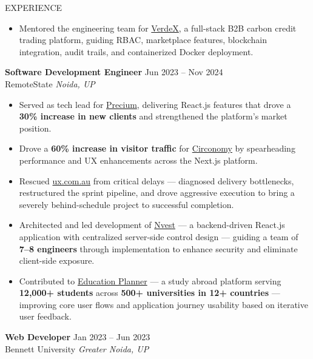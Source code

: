 \documentclass{resume} %
\begin{document}
\begin{rSection}{EXPERIENCE}
\begin{itemize}
    \item Mentored the engineering team for \href{https://verdex.co.in/}{VerdeX}, a full-stack B2B carbon credit trading platform, guiding RBAC, marketplace features, blockchain integration, audit trails, and containerized Docker deployment.

\end{itemize}

\textbf{Software Development Engineer} \hfill Jun 2023 -- Nov 2024\\
RemoteState \hfill \textit{Noida, UP}
\begin{itemize}
    \itemsep -5pt {}

    \item Served as tech lead for \href{https://precium.in}{Precium}, delivering React.js features that drove a \textbf{30\% increase in new clients} and strengthened the platform's market position.

    \item Drove a \textbf{60\% increase in visitor traffic} for \href{https://www.circonomy.co/}{Circonomy} by spearheading performance and UX enhancements across the Next.js platform.

    \item Rescued \href{https://ux.com.au}{ux.com.au} from critical delays — diagnosed delivery bottlenecks, restructured the sprint pipeline, and drove aggressive execution to bring a severely behind-schedule project to successful completion.

    \item Architected and led development of \href{https://nvest.in/}{Nvest} — a backend-driven React.js application with centralized server-side control design — guiding a team of \textbf{7--8 engineers} through implementation to enhance security and eliminate client-side exposure.

    \item Contributed to \href{https://educationplanner.io}{Education Planner} — a study abroad platform serving \textbf{12,000+ students} across \textbf{500+ universities in 12+ countries} — improving core user flows and application journey usability based on iterative user feedback.

\end{itemize}

\textbf{Web Developer} \hfill Jan 2023 -- Jun 2023\\
Bennett University \hfill \textit{Greater Noida, UP}
\begin{itemize}
    \itemsep -5pt {}


\end{itemize}
\end{rSection}
\end{document}
